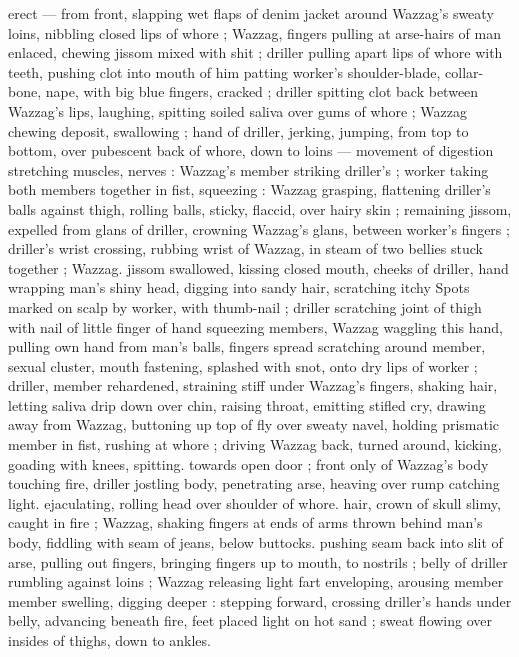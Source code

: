 erect --- from front, slapping wet flaps of denim jacket around
Wazzag's sweaty loins, nibbling closed lips of whore ; Wazzag,
fingers pulling at arse-hairs of man enlaced, chewing jissom mixed
with shit ; driller pulling apart lips of whore with teeth, pushing clot
into mouth of him patting worker's shoulder-blade, collar-bone,
nape, with big blue fingers, cracked ; driller spitting clot back
between Wazzag's lips, laughing, spitting soiled saliva over gums of
whore ; Wazzag chewing deposit, swallowing ; hand of driller, jerking,
jumping, from top to bottom, over pubescent back of whore, down to
loins --- movement of digestion stretching muscles, nerves :
Wazzag's member striking driller's ; worker taking both members
together in fist, squeezing : Wazzag grasping, flattening driller's
balls against thigh, rolling balls, sticky, flaccid, over hairy skin ;
remaining jissom, expelled from glans of driller, crowning Wazzag's
glans, between worker's fingers ; driller's wrist crossing, rubbing
wrist of Wazzag, in steam of two bellies stuck together ; Wazzag.
jissom swallowed, kissing closed mouth, cheeks of driller, hand
wrapping man's shiny head, digging into sandy hair, scratching itchy
Spots marked on scalp by worker, with thumb-nail ; driller scratching
joint of thigh with nail of little finger of hand squeezing members,
Wazzag waggling this hand, pulling own hand from man’s balls,
fingers spread scratching around member, sexual cluster, mouth
fastening, splashed with snot, onto dry lips of worker ; driller,
member rehardened, straining stiff under Wazzag's fingers, shaking
hair, letting saliva drip down over chin, raising throat, emitting stifled
cry, drawing away from Wazzag, buttoning up top of fly over sweaty
navel, holding prismatic member in fist, rushing at whore ; driving
Wazzag back, turned around, kicking, goading with knees, spitting.
towards open door ; front only of Wazzag's body touching fire, driller
jostling body, penetrating arse, heaving over rump catching light.
ejaculating, rolling head over shoulder of whore. hair, crown of skull
slimy, caught in fire ; Wazzag, shaking fingers at ends of arms thrown
behind man’s body, fiddling with seam of jeans, below buttocks.
pushing seam back into slit of arse, pulling out fingers, bringing
fingers up to mouth, to nostrils ; belly of driller rumbling against
loins ; Wazzag releasing light fart enveloping, arousing member
member swelling, digging deeper : stepping forward, crossing
driller's hands under belly, advancing beneath fire, feet placed light
on hot sand ; sweat flowing over insides of thighs, down to ankles.
